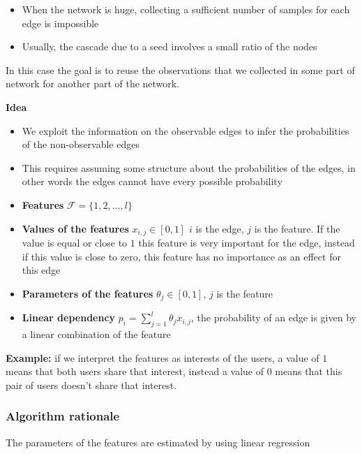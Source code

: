 \documentclass[10pt,a4paper]{article}
\begin{document}
\begin{itemize}

\item When the network is huge, collecting a sufficient number of samples for each edge is impossible
\item Usually, the cascade due to a seed involves a small ratio of the nodes
\end{itemize}

In this case the goal is to reuse the observations that we collected in some part of network for another part of the network.
\newline

\textbf{Idea}

\begin{itemize}

\item We exploit the information on the observable edges to infer the probabilities of the non-observable edges
\item This requires assuming some structure about the probabilities of the edges, in other words the edges cannot have every possible probability
\item \textbf{Features} $\mathscr{F} = \{1,2,\ldots,l\}$
\item \textbf{Values of the features} $x_{i,j} \in [0,1]$ $i$ is the edge, $j$ is the feature. If the value is equal or close to $1$  this feature is very important for the edge, instead if this value is close to zero, this feature has no importance as an effect for this edge
\item \textbf{Parameters of the features} $\theta_j \in [0,1]$, $j$ is the feature
\item \textbf{Linear dependency} $p_i = \sum_{j=1}^{l}{\theta_j x_{i,j}}$, the probability of an edge is given by a linear combination of the feature
\end{itemize}

\textbf{Example:} if we interpret the features as interests of the users, a value of $1$ means that both users share that interest, instead a value of $0$ means that this pair of users doesn't share that interest.

\subsubsection{Algorithm rationale}\label{algorithm-rationale}

The parameters of the features are estimated by using linear regression
\end{document}
